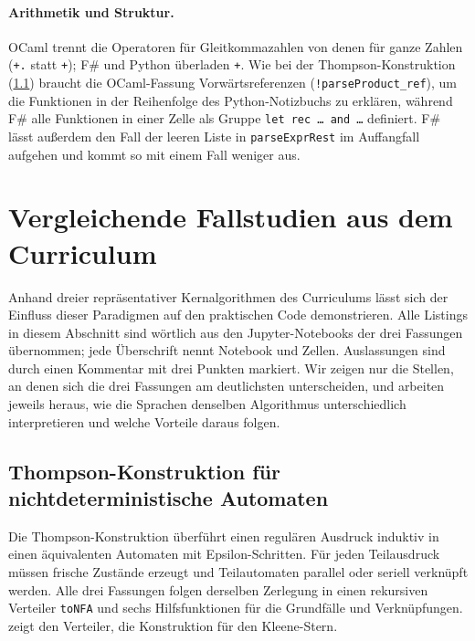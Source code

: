 \paragraph{Arithmetik und Struktur.}
OCaml trennt die Operatoren für Gleitkommazahlen von denen für ganze Zahlen (\texttt{+.} statt \texttt{+}); F\# und Python überladen \texttt{+}.
Wie bei der Thompson-Konstruktion (\cref{sec:case_thompson}) braucht die OCaml-Fassung Vorwärtsreferenzen (\texttt{!parseProduct\_ref}), um die Funktionen in der Reihenfolge des Python-Notizbuchs zu erklären, während F\# alle Funktionen in einer Zelle als Gruppe \texttt{let rec \dots{} and \dots} definiert.
F\# lässt außerdem den Fall der leeren Liste in \texttt{parseExprRest} im Auffangfall aufgehen und kommt so mit einem Fall weniger aus.

\section{Vergleichende Fallstudien aus dem Curriculum}
\label{sec:algorithmic_case_studies}

Anhand dreier repräsentativer Kernalgorithmen des Curriculums lässt sich der Einfluss dieser Paradigmen auf den praktischen Code demonstrieren.
Alle Listings in diesem Abschnitt sind wörtlich aus den Jupyter-Notebooks der drei Fassungen übernommen; jede Überschrift nennt Notebook und Zellen.
Auslassungen sind durch einen Kommentar mit drei Punkten markiert.
Wir zeigen nur die Stellen, an denen sich die drei Fassungen am deutlichsten unterscheiden, und arbeiten jeweils heraus, wie die Sprachen denselben Algorithmus unterschiedlich interpretieren und welche Vorteile daraus folgen.

\subsection{Thompson-Konstruktion für nichtdeterministische Automaten}
\label{sec:case_thompson}
Die Thompson-Konstruktion überführt einen regulären Ausdruck induktiv in einen äquivalenten Automaten mit Epsilon-Schritten.
Für jeden Teilausdruck müssen frische Zustände erzeugt und Teilautomaten parallel oder seriell verknüpft werden.
Alle drei Fassungen folgen derselben Zerlegung in einen rekursiven Verteiler \texttt{toNFA} und sechs Hilfsfunktionen für die Grundfälle und Verknüpfungen.
 zeigt den Verteiler,  die Konstruktion für den Kleene-Stern.

